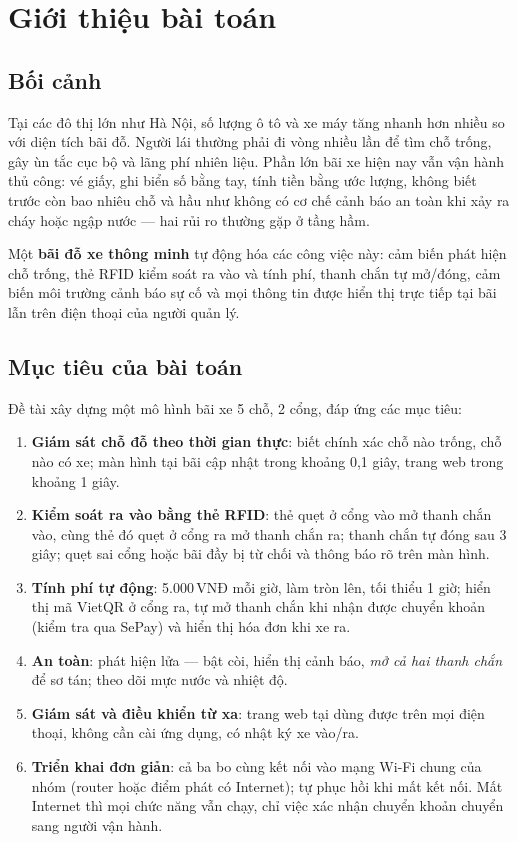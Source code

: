 \chapter{Giới thiệu bài toán}\label{chap:gioithieu}

\section{Bối cảnh}
Tại các đô thị lớn như Hà Nội, số lượng ô tô và xe máy tăng nhanh hơn nhiều so với
diện tích bãi đỗ. Người lái thường phải đi vòng nhiều lần để tìm chỗ trống, gây ùn
tắc cục bộ và lãng phí nhiên liệu. Phần lớn bãi xe hiện nay vẫn vận hành thủ công:
vé giấy, ghi biển số bằng tay, tính tiền bằng ước lượng, không biết trước còn bao
nhiêu chỗ và hầu như không có cơ chế cảnh báo an toàn khi xảy ra cháy hoặc ngập
nước — hai rủi ro thường gặp ở tầng hầm.

Một \textbf{bãi đỗ xe thông minh} tự động hóa các công việc này: cảm biến phát hiện
chỗ trống, thẻ RFID kiểm soát ra vào và tính phí, thanh chắn tự mở/đóng, cảm biến
môi trường cảnh báo sự cố và mọi thông tin được hiển thị trực tiếp tại bãi lẫn trên
điện thoại của người quản lý.

\section{Mục tiêu của bài toán}
Đề tài xây dựng một mô hình bãi xe 5 chỗ, 2 cổng, đáp ứng các mục tiêu:
\begin{enumerate}
  \item \textbf{Giám sát chỗ đỗ theo thời gian thực}: biết chính xác chỗ nào trống,
        chỗ nào có xe; màn hình tại bãi cập nhật trong khoảng 0,1 giây, trang web trong
        khoảng 1 giây.
  \item \textbf{Kiểm soát ra vào bằng thẻ RFID}: thẻ quẹt ở cổng vào mở thanh chắn
        vào, cùng thẻ đó quẹt ở cổng ra mở thanh chắn ra; thanh chắn tự đóng sau 3 giây;
        quẹt sai cổng hoặc bãi đầy bị từ chối và thông báo rõ trên màn hình.
  \item \textbf{Tính phí tự động}: 5.000\,VNĐ mỗi giờ, làm tròn lên, tối thiểu 1 giờ;
        hiển thị mã VietQR ở cổng ra, tự mở thanh chắn khi nhận được chuyển khoản
        (kiểm tra qua SePay) và hiển thị hóa đơn khi xe ra.
  \item \textbf{An toàn}: phát hiện lửa — bật còi, hiển thị cảnh báo, \emph{mở cả hai
        thanh chắn} để sơ tán; theo dõi mực nước và nhiệt độ.
  \item \textbf{Giám sát và điều khiển từ xa}: trang web tại 
        dùng được trên mọi điện thoại, không cần cài ứng dụng, có nhật ký xe vào/ra.
  \item \textbf{Triển khai đơn giản}: cả ba bo cùng kết nối vào mạng Wi-Fi chung của
        nhóm (router hoặc điểm phát có Internet); tự phục hồi khi mất kết nối. Mất
        Internet thì mọi chức năng vẫn chạy, chỉ việc xác nhận chuyển khoản chuyển sang
        người vận hành.
\end{enumerate}

